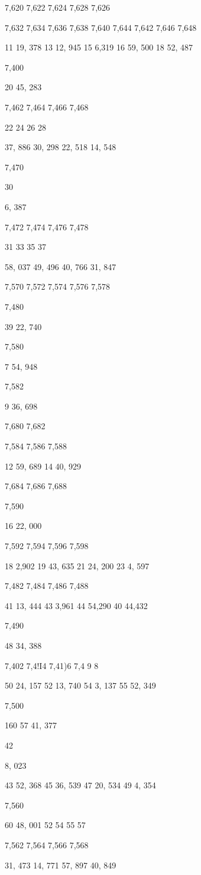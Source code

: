\documentclass[10pt,a4paper]{article}
\begin{document}
7,620
7,622
7,624
7,628
7,626

7,632
7,634
7,636
7,638
7,640
7,644
7,642
7,646
7,648

11 19, 378
13 12, 945
15 6,319
16 59, 500
18 52, 487

7,400

20 45, 283

7,462
7,464
7,466
7,468

22
24
26
28

37, 886
30, 298
22, 518
14, 548

7,470

30

6, 387

7,472
7,474
7,476
7,478

31
33
35
37

58, 037
49, 496
40, 766
31, 847

7,570
7,572
7,574
7,576
7,578

7,480

39 22, 740

7,580

7 54, 948

7,582

9 36, 698

7,680
7,682

7,584
7,586
7,588

12 59, 689
14 40, 929

7,684
7,686
7,688

7,590

16 22, 000

7,592
7,594
7,596
7,598

18 2,902
19 43, 635
21 24, 200
23
4, 597

7,482
7,484
7,486
7,488

41 13, 444
43 3,961
44 54,290
40 44,432

7,490

48 34, 388

7,402
7,4!I4
7,41)6
7,4 9 8

50 24, 157
52 13, 740
54 3, 137
55 52, 349

7,500

160 57 41, 377

42

8, 023

43 52, 368
45 36, 539
47 20, 534
49 4, 354

7,560

60 48, 001
52
54
55
57

7,562
7,564
7,566
7,568

31, 473
14, 771
57, 897
40, 849
\end{document}
